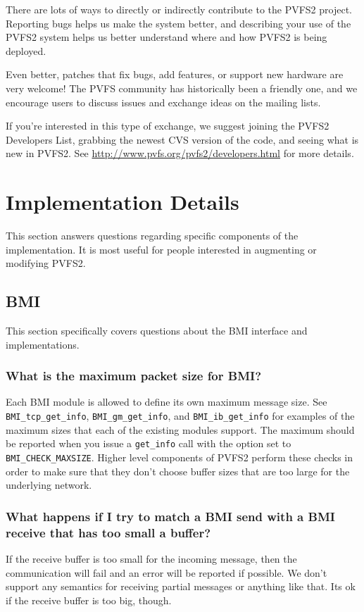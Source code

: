 \documentclass[11pt,letterpaper]{article}
\begin{document}
There are lots of ways to directly or indirectly contribute to the PVFS2
project.  Reporting bugs helps us make the system better, and describing your
use of the PVFS2 system helps us better understand where and how PVFS2 is
being deployed.

Even better, patches that fix bugs, add features, or support new hardware are
very welcome!  The PVFS community has historically been a friendly one, and we
encourage users to discuss issues and exchange ideas on the mailing lists.

If you're interested in this type of exchange, we suggest joining the PVFS2
Developers List, grabbing the newest CVS version of the code, and seeing what
is new in PVFS2.  See \url{http://www.pvfs.org/pvfs2/developers.html} for more
details.

%
%
\section{Implementation Details}

This section answers questions regarding specific components of the
implementation.  It is most useful for people interested in augmenting or
modifying PVFS2.

\subsection{BMI}

This section specifically covers questions about the BMI interface and
implementations.

\subsubsection{What is the maximum packet size for BMI?}

Each BMI module is allowed to define its own maximum message size.  See
\texttt{BMI\_tcp\_get\_info}, \texttt{BMI\_gm\_get\_info}, and
\texttt{BMI\_ib\_get\_info} for examples of the maximum sizes that each of the
existing modules support.  The maximum should be reported when you issue a
\texttt{get\_info} call with the option set to \texttt{BMI\_CHECK\_MAXSIZE}.
Higher level components of PVFS2 perform these checks in order to make sure
that they don't choose buffer sizes that are too large for the underlying
network.

\subsubsection{What happens if I try to match a BMI send with a BMI receive
               that has too small a buffer?}

If the receive buffer is too small for the incoming message, then the
communication will fail and an error will be reported if possible.  We
don't support any semantics for receiving partial messages or anything like
that.  Its ok if the receive buffer is too big, though.
    
\end{document}
